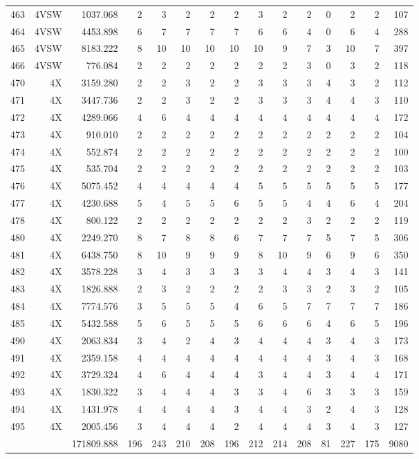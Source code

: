 \documentclass[12pt]{article}\usepackage[]{graphicx}\usepackage[]{color}
\begin{document}
\begin{landscapepage}
\begin{longtable}[t]{crrrrrrrrrrrrrr}
463 & 4VSW & 1037.068 & 2 & 3 & 2 & 2 & 2 & 3 & 2 & 2 & 0 & 2 & 2 & 107\\
464 & 4VSW & 4453.898 & 6 & 7 & 7 & 7 & 7 & 6 & 6 & 4 & 0 & 6 & 4 & 288\\
465 & 4VSW & 8183.222 & 8 & 10 & 10 & 10 & 10 & 10 & 9 & 7 & 3 & 10 & 7 & 397\\
466 & 4VSW & 776.084 & 2 & 2 & 2 & 2 & 2 & 2 & 2 & 3 & 0 & 3 & 2 & 118\\
470 & 4X & 3159.280 & 2 & 2 & 3 & 2 & 2 & 3 & 3 & 3 & 4 & 3 & 2 & 112\\
471 & 4X & 3447.736 & 2 & 2 & 3 & 2 & 2 & 3 & 3 & 3 & 4 & 4 & 3 & 110\\
472 & 4X & 4289.066 & 4 & 6 & 4 & 4 & 4 & 4 & 4 & 4 & 4 & 4 & 4 & 172\\
473 & 4X & 910.010 & 2 & 2 & 2 & 2 & 2 & 2 & 2 & 2 & 2 & 2 & 2 & 104\\
474 & 4X & 552.874 & 2 & 2 & 2 & 2 & 2 & 2 & 2 & 2 & 2 & 2 & 2 & 100\\
475 & 4X & 535.704 & 2 & 2 & 2 & 2 & 2 & 2 & 2 & 2 & 2 & 2 & 2 & 103\\
476 & 4X & 5075.452 & 4 & 4 & 4 & 4 & 4 & 5 & 5 & 5 & 5 & 5 & 5 & 177\\
477 & 4X & 4230.688 & 5 & 4 & 5 & 5 & 6 & 5 & 5 & 4 & 4 & 6 & 4 & 204\\
478 & 4X & 800.122 & 2 & 2 & 2 & 2 & 2 & 2 & 2 & 3 & 2 & 2 & 2 & 119\\
480 & 4X & 2249.270 & 8 & 7 & 8 & 8 & 6 & 7 & 7 & 7 & 5 & 7 & 5 & 306\\
481 & 4X & 6438.750 & 8 & 10 & 9 & 9 & 9 & 8 & 10 & 9 & 6 & 9 & 6 & 350\\
482 & 4X & 3578.228 & 3 & 4 & 3 & 3 & 3 & 3 & 4 & 4 & 3 & 4 & 3 & 141\\
483 & 4X & 1826.888 & 2 & 3 & 2 & 2 & 2 & 2 & 3 & 3 & 2 & 3 & 2 & 105\\
484 & 4X & 7774.576 & 3 & 5 & 5 & 5 & 4 & 6 & 5 & 7 & 7 & 7 & 7 & 186\\
485 & 4X & 5432.588 & 5 & 6 & 5 & 5 & 5 & 6 & 6 & 6 & 4 & 6 & 5 & 196\\
490 & 4X & 2063.834 & 3 & 4 & 2 & 4 & 3 & 4 & 4 & 4 & 3 & 4 & 3 & 173\\
491 & 4X & 2359.158 & 4 & 4 & 4 & 4 & 4 & 4 & 4 & 4 & 3 & 4 & 3 & 168\\
492 & 4X & 3729.324 & 4 & 6 & 4 & 4 & 4 & 3 & 4 & 4 & 3 & 4 & 4 & 171\\
493 & 4X & 1830.322 & 3 & 4 & 4 & 4 & 3 & 3 & 4 & 6 & 3 & 3 & 3 & 159\\
494 & 4X & 1431.978 & 4 & 4 & 4 & 4 & 3 & 4 & 4 & 3 & 2 & 4 & 3 & 128\\
495 & 4X & 2005.456 & 3 & 4 & 4 & 4 & 2 & 4 & 4 & 4 & 3 & 4 & 3 & 127\\
 &  & 171809.888 & 196 & 243 & 210 & 208 & 196 & 212 & 214 & 208 & 81 & 227 & 175 & 9080\\*
\end{longtable}
\endgroup{}
\end{landscapepage}
\clearpage
\end{document}
